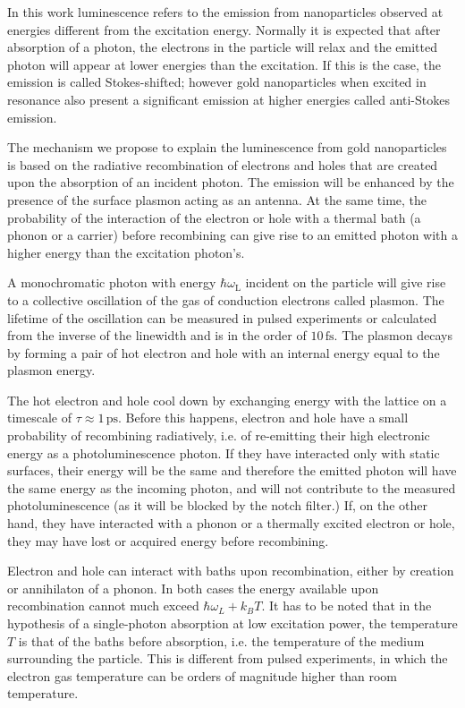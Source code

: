 \documentclass[journal=nalefd,manuscript=letter]{achemso}
\newcommand{\fs}{\ensuremath{\,\textrm{fs}}}
\newcommand{\ps}{\ensuremath{\,\textrm{ps}}}
\begin{document}
In this work luminescence refers to the emission from nanoparticles observed at
energies different from the excitation energy. Normally it is expected that
after absorption of a photon, the electrons in the particle will relax and the
emitted photon will appear at lower energies than the excitation. If this is the
case, the emission is called Stokes-shifted; however gold nanoparticles when
excited in resonance also present a significant emission at higher energies
called anti-Stokes emission\cite{He2015,Jiang2013,Carattino2016a}.

The mechanism we propose to explain the luminescence from gold nanoparticles is
based on the radiative recombination of electrons and holes that are created
upon the absorption of an incident photon\cite{Dulkeith2004,Mooradian1969}. The
emission will be enhanced by the presence of the surface plasmon acting as an
antenna\cite{Mohamed2000}. At the same time, the probability of the interaction
of the electron or hole with a thermal bath (a phonon or a carrier) before
recombining can give rise to an emitted photon with a higher energy than the
excitation photon's\cite{Hodak2000,Giri2015,Arbouet2003a}.

A monochromatic photon with energy $\hbar\omega_\textrm{L}$ incident on the
particle will give rise to a collective oscillation of the gas of conduction
electrons called plasmon. The lifetime of the oscillation can be measured in
pulsed experiments or calculated from the inverse of the linewidth and is in the
order of $10\fs$\cite{Sonnichsen2002}. The plasmon decays by forming a pair of
hot electron and hole with an internal energy equal to the plasmon
energy\cite{Sundararaman2014,Brongersma2015,AlejandroManjavacasJunG.LiuVikramKulkarni2014}.

The hot electron and hole cool down by exchanging energy with the lattice on a
timescale of $\tau\approx1\ps$\cite{Pustovalov2005}. Before this happens,
electron and hole have a small probability of recombining radiatively, i.e. of 
re-emitting their high electronic energy as a photoluminescence photon. If they
have interacted only with static surfaces, their energy will be the same and
therefore the emitted photon will have the same energy as the incoming
photon, and will not contribute to the measured photoluminescence (as it will be
blocked by the notch filter.) If, on the other hand, they have interacted with a
phonon or a thermally excited electron or hole, they may have lost or acquired
energy before recombining.

Electron and hole can interact with baths upon recombination, either by
creation or annihilaton of a phonon. In both cases the energy available upon
recombination cannot much exceed $\hbar\omega_L+k_BT$. It has to be noted that
in the hypothesis of a single-photon absorption at low excitation power, the
temperature $T$ is that of the baths before absorption, i.e. the temperature of
the medium surrounding the particle. This is different from pulsed experiments,
in which the electron gas temperature can be orders of magnitude higher than
room temperature\cite{Baffou2013a}. 
\end{document}
